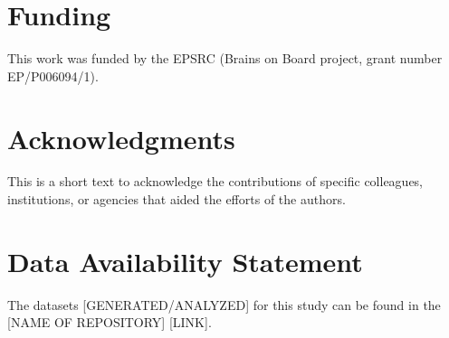 \documentclass[utf8]{frontiersSCNS} %
\begin{document}
\section*{Funding}
This work was funded by the EPSRC (Brains on Board project, grant number EP/P006094/1).

\section*{Acknowledgments}
This is a short text to acknowledge the contributions of specific colleagues, institutions, or agencies that aided the efforts of the authors.

\section*{Data Availability Statement}
The datasets [GENERATED/ANALYZED] for this study can be found in the [NAME OF REPOSITORY] [LINK].


\end{document}
